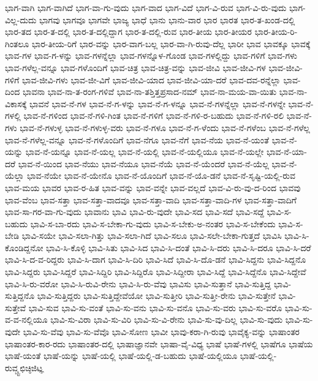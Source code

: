 {ಭಾಗ-ವಾಗಿ
ಭಾಗ-ವಾಗಿದೆ
ಭಾಗ-ವಾ-ಗು-ವುದು
ಭಾಗ-ವಾದ
ಭಾಗ-ವಿದೆ
ಭಾಗ-ವಿ-ರುವ
ಭಾಗ-ವಿ-ರು-ವುದು
ಭಾಗ-ವಿಲ್ಲ-ದುದು
ಭಾಗವು
ಭಾಗವೂ
ಭಾಗವೇ
ಭಾಜ್ಯ
ಭಾಧೆ
ಭಾನು
ಭಾನು-ವಾರ
ಭಾರ
ಭಾರತ
ಭಾರ-ತ-ಖಂಡ-ದಲ್ಲಿ
ಭಾರ-ತದ
ಭಾರ-ತ-ದಲ್ಲಿ
ಭಾರ-ತ-ದಲ್ಲಿದ್ದಾಗ
ಭಾರ-ತ-ದಲ್ಲಿ-ರುವ
ಭಾರ-ತೀಯ
ಭಾರ-ತೀಯರ
ಭಾರ-ತೀಯ-ರಿ-ಗಿಂತಲೂ
ಭಾರ-ತೀಯ-ರಿಗೆ
ಭಾರ-ವನ್ನು
ಭಾರ-ವಾಗ-ಬಲ್ಲ
ಭಾರ-ವಾ-ಗಿ-ರುವು-ದೆಲ್ಲ
ಭಾರೀ
ಭಾವ
ಭಾವಕ್ಕೂ
ಭಾವಕ್ಕೆ
ಭಾವ-ಗಳ
ಭಾವ-ಗ-ಳನ್ನು
ಭಾವ-ಗಳನ್ನೆಲ್ಲಾ
ಭಾವ-ಗಳನ್ನೊಳ-ಗೊಂಡ
ಭಾವ-ಗಳಲ್ಲಿದ್ದು
ಭಾವ-ಗಳಿಗೆ
ಭಾವ-ಗಳು
ಭಾವ-ಗಳೆಲ್ಲ-ವನ್ನೂ
ಭಾವ-ಗಳೊಂದಿಗೆ
ಭಾವ-ಚಿತ್ರ
ಭಾವ-ಚಿತ್ರ-ವನ್ನು
ಭಾವ-ಜೀವಿ
ಭಾವ-ಜೀವಿ-ಗಳ
ಭಾವ-ಜೀವಿ-ಗಳಿಗೆ
ಭಾವ-ಜೀವಿ-ಗಳು
ಭಾವ-ಜೀ-ವಿಗೆ
ಭಾವ-ಜೀವಿ-ಯಾದ
ಭಾವ-ಜೀವಿ-ಯಾ-ದರೆ
ಭಾವ-ದವ-ರನ್ನೆಲ್ಲಾ
ಭಾವ-ದಿಂದ
ಭಾವನಾ
ಭಾವ-ನಾ-ತ-ರಂಗ-ಗಳಿವೆ
ಭಾವ-ನಾ-ತಶ್ತಿತ್ತಪ್ರಸಾದ-ನಮ್
ಭಾವ-ನಾ-ಮಯ-ವಾ-ಯಿತು
ಭಾವ-ನಾ-ವಿಕಾಸಕ್ಕೆ
ಭಾವನೆ
ಭಾವ-ನೆ-ಗಳ
ಭಾವ-ನೆ-ಗ-ಳನ್ನು
ಭಾವ-ನೆ-ಗ-ಳನ್ನೂ
ಭಾವ-ನೆ-ಗಳನ್ನೆಲ್ಲಾ
ಭಾವ-ನೆ-ಗಳನ್ನೇ
ಭಾವ-ನೆ-ಗಳಲ್ಲಿ
ಭಾವ-ನೆ-ಗಳಿಂದ
ಭಾವ-ನೆ-ಗಳಿ-ಗಿಂತ
ಭಾವ-ನೆ-ಗಳಿಗೆ
ಭಾವ-ನೆ-ಗಳಿ-ರ-ಬಹುದು
ಭಾವ-ನೆ-ಗಳಿ-ರಲಿ
ಭಾವ-ನೆ-ಗಳು
ಭಾವ-ನೆ-ಗಳುಳ್ಳ
ಭಾವ-ನೆ-ಗಳುಳ್ಳ-ವರು
ಭಾವ-ನೆ-ಗಳೂ
ಭಾವ-ನೆ-ಗ-ಳೆಂದು
ಭಾವ-ನೆ-ಗಳೆಂಬ
ಭಾವ-ನೆ-ಗಳೆಲ್ಲ
ಭಾವ-ನೆ-ಗಳೆಲ್ಲ-ವನ್ನೂ
ಭಾವ-ನೆ-ಗಳೊಂದಿಗೆ
ಭಾವ-ನೆಗೂ
ಭಾವ-ನೆಗೆ
ಭಾವ-ನೆಯ
ಭಾವ-ನೆ-ಯಂತೆ
ಭಾವ-ನೆ-ಯನ್ನು
ಭಾವ-ನೆ-ಯನ್ನೂ
ಭಾವ-ನೆ-ಯಲ್ಲ
ಭಾವ-ನೆ-ಯಲ್ಲಿ
ಭಾವ-ನೆ-ಯಲ್ಲಿಯೂ
ಭಾವ-ನೆ-ಯಲ್ಲೇ
ಭಾವ-ನೆ-ಯಾ-ದರೆ
ಭಾವ-ನೆ-ಯಿಂದ
ಭಾವ-ನೆಯು
ಭಾವ-ನೆಯೂ
ಭಾವ-ನೆಯೆ
ಭಾವ-ನೆ-ಯೆಂದರೆ
ಭಾವ-ನೆ-ಯೆಲ್ಲ
ಭಾವ-ನೆ-ಯೆಲ್ಲಾ
ಭಾವ-ನೆಯೇ
ಭಾವ-ನೆ-ಯೇನೊ
ಭಾವ-ನೆ-ಯೊಂದಿಗೆ
ಭಾವ-ನೆ-ಯೊ-ಡನೆ
ಭಾವ-ನೆ-ಸೃಷ್ಟಿ-ಯಲ್ಲಿ-ರುವ
ಭಾವ-ಮಯ
ಭಾವರ
ಭಾವ-ರ-ಹಿತ
ಭಾವ-ವನ್ನು
ಭಾವ-ವನ್ನೇ
ಭಾವ-ವಲ್ಲದೆ
ಭಾವ-ವಿ-ರು-ವು-ದ-ರಿಂದ
ಭಾವವು
ಭಾವ-ವೆಂಬ
ಭಾವ-ಸತ್ತಾ
ಭಾವ-ಸತ್ತಾ-ವಾದವೂ
ಭಾವ-ಸತ್ತಾ-ವಾದಿ
ಭಾವ-ಸತ್ತಾ-ವಾದಿ-ಗಳ
ಭಾವ-ಸತ್ತಾ-ವಾದಿಗೆ
ಭಾವ-ಸಾ-ಗರ-ವಾ-ಗು-ವುದು
ಭಾವಾನು
ಭಾವಿ
ಭಾವಿ-ರು-ವುದೇ
ಭಾವಿ-ಸದ
ಭಾವಿ-ಸದೆ
ಭಾವಿ-ಸದ್ದೆ
ಭಾವಿ-ಸ-ಬಹುದು
ಭಾವಿ-ಸ-ಬಾ-ರದು
ಭಾವಿ-ಸ-ಬೇಕಾ-ಗು-ವುದು
ಭಾವಿ-ಸ-ಬೇಕು-ಅ-ನಂತರ
ಭಾವಿ-ಸ-ಬೇಕೆಂದು
ಭಾವಿ-ಸ-ಬೇಡಿ
ಭಾವಿ-ಸಯೇ
ಭಾವಿ-ಸಲಾ-ಗಿತ್ತು
ಭಾವಿ-ಸಲಾ-ಗಿದೆ
ಭಾವಿ-ಸಲೂ
ಭಾವಿ-ಸಲೇ-ಬೇಕಾ-ಗುತ್ತದೆ
ಭಾವಿಸಿ
ಭಾವಿ-ಸಿ-ಕೊಂಡಿದ್ದನೋ
ಭಾವಿ-ಸಿ-ಕೊಳ್ಳಿ
ಭಾವಿ-ಸಿತು
ಭಾವಿ-ಸಿದ
ಭಾವಿ-ಸಿ-ದಂತೆ
ಭಾವಿ-ಸಿ-ದರು
ಭಾವಿ-ಸಿ-ದರೂ
ಭಾವಿ-ಸಿ-ದರೆ
ಭಾವಿ-ಸಿ-ದ-ವ-ರಿದ್ದರು
ಭಾವಿ-ಸಿ-ದಾಗ
ಭಾವಿ-ಸಿ-ದಿರಿ
ಭಾವಿ-ಸಿದೆ
ಭಾವಿ-ಸಿ-ದೊ-ಡನೆ
ಭಾವಿ-ಸಿದ್ದನು
ಭಾವಿ-ಸಿದ್ದನೊ
ಭಾವಿ-ಸಿದ್ದರು
ಭಾವಿ-ಸಿದ್ದರೆ
ಭಾವಿ-ಸಿದ್ದಿರಿ
ಭಾವಿ-ಸಿದ್ದಿರೊ
ಭಾವಿ-ಸಿದ್ದೀರಾ
ಭಾವಿ-ಸಿದ್ದೆ
ಭಾವಿ-ಸಿದ್ದೆನೊ
ಭಾವಿ-ಸಿದ್ದೇವೆ
ಭಾವಿ-ಸಿ-ರು-ವರೋ
ಭಾವಿ-ಸಿ-ರುವಿ-ರೇನು
ಭಾವಿ-ಸಿ-ರು-ವೆವು
ಭಾವಿಸು
ಭಾವಿ-ಸುತ್ತಾನೆ
ಭಾವಿ-ಸುತ್ತಿದ್ದ
ಭಾವಿ-ಸುತ್ತಿದ್ದನೊ
ಭಾವಿ-ಸುತ್ತಿದ್ದರು
ಭಾವಿ-ಸುತ್ತಿದ್ದೇವೆಯೋ
ಭಾವಿ-ಸುತ್ತೀರಿ
ಭಾವಿ-ಸುತ್ತೀ-ರೇನು
ಭಾವಿ-ಸುತ್ತೇನೆ
ಭಾವಿ-ಸುತ್ತೇವೆ
ಭಾವಿ-ಸುವ
ಭಾವಿ-ಸು-ವಂತೆ
ಭಾವಿ-ಸು-ವನು
ಭಾವಿ-ಸು-ವನೊ
ಭಾವಿ-ಸು-ವರು
ಭಾವಿ-ಸು-ವರೊ
ಭಾವಿ-ಸು-ವ-ವ-ನಲ್ಲಿಯೂ
ಭಾವಿ-ಸು-ವಿರಾ
ಭಾವಿ-ಸು-ವಿರಿ
ಭಾವಿ-ಸು-ವಿ-ರೇನು
ಭಾವಿ-ಸು-ವು-ದಿಲ್ಲ
ಭಾವಿ-ಸು-ವುದು
ಭಾವಿ-ಸು-ವುದೇ
ಭಾವಿ-ಸು-ವೆವು
ಭಾವಿ-ಸು-ವೆವೊ
ಭಾವಿ-ಸೋಣ
ಭಾವೀ
ಭಾವು-ಕರಾ-ಗಿ-ರುವು
ಭಾವೈಕ್ಯ-ವನ್ನು
ಭಾಷಾಂತರ
ಭಾಷಾಂತರ-ಕಾರ-ರದು
ಭಾಷಾಂತರ-ದಲ್ಲಿ
ಭಾಷಾಜ್ಞಾನವೇ
ಭಾಷಾ-ವೈ-ವಿಧ್ಯ
ಭಾಷೆ
ಭಾಷೆ-ಗಳಲ್ಲಿ
ಭಾಷೆಗೂ
ಭಾಷೆಯ
ಭಾಷೆ-ಯಂತೆ
ಭಾಷೆ-ಯನ್ನು
ಭಾಷೆ-ಯಲ್ಲಿ
ಭಾಷೆ-ಯಲ್ಲಿ-ಡ-ಬಹುದು
ಭಾಷೆ-ಯಲ್ಲಿಯೂ
ಭಾಷೆ-ಯಲ್ಲಿ-ರುವ್ಚ್ಟಛಿಚ್ಠಿಜಿಟ್ಞ
}
